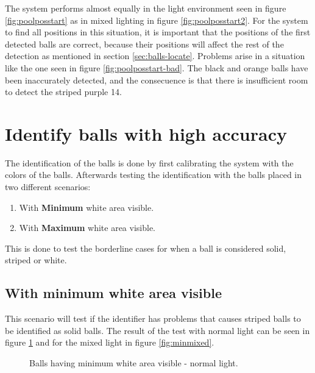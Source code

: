 The system performs almost equally in the light environment seen in figure \ref{fig:poolposstart} as in mixed lighting in figure \ref{fig:poolposstart2}. For the system to find all positions in this situation, it is important that the positions of the first detected balls are correct, because their positions will affect the rest of the detection as mentioned in section \ref{sec:balls-locate}. Problems arise in a situation like the one seen in figure \ref{fig:poolposstart-bad}. The black and orange balls have been inaccurately detected, and the consecuence is that there is insufficient room to detect the striped purple 14.


\section{Identify balls with high accuracy}
The identification of the balls is done by first calibrating the system with the colors of the balls. Afterwards testing the identification with the balls placed in two different scenarios:

\begin{enumerate}
\setlength{\itemsep}{0mm}
	\item With \textbf{Minimum} white area visible.
	\item With \textbf{Maximum} white area visible.
\end{enumerate}
This is done to test the borderline cases for when a ball is considered solid, striped or white.

\subsection{With minimum white area visible}
This scenario will test if the identifier has problems that causes striped balls to be identified as solid balls.
The result of the test with normal light can be seen in figure \ref{fig:minnormal} and for the mixed light in figure \ref{fig:minmixed}.
\begin{figure}[htpb]
  \centering
  \quad
	\quad
   \caption{Balls having minimum white area visible - normal light.}
  \label{fig:minnormal}
\end{figure}

